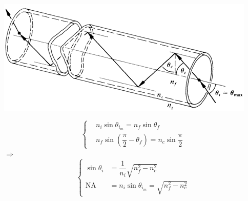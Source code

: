 \begin{minipage}[htbp]{0.6\linewidth}
  \includegraphics[width=\linewidth]{figures/optic-fiber.png}
\end{minipage}
\begin{minipage}[htbp]{0.4\linewidth}
  \begin{equation*}
    \left\{
    \begin{aligned}
      & n_i \sin \theta_{i_m} = n_f \sin \theta_f \\
      & n_f \sin \left( \dfrac{\pi}{2} - \theta_f  \right) = n_c \sin \dfrac{\pi}{2}
    \end{aligned}
    \right.
  \end{equation*}
  $\Rightarrow$
  \begin{equation*}
    \left\{ 
    \begin{aligned}
      \sin \theta_i &= \dfrac{1}{n_i} \sqrt{n_f^2 - n_c^2} \\
      \text{NA} &= n_i \sin \theta_{i_m} = \sqrt{n_f^2 - n_c^2}
    \end{aligned}
    \right. 
  \end{equation*}
\end{minipage}

